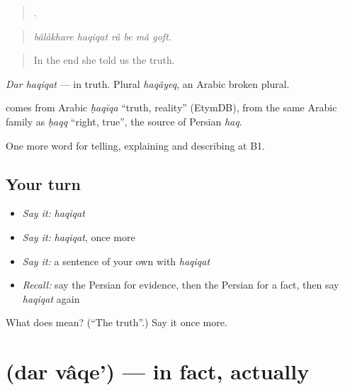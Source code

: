 \begin{quote}
     .
\end{quote}

\begin{quote}
\emph{bâlâkhare haqiqat râ be mâ goft.}
\end{quote}

\begin{quote}
In the end she told us the truth.
\end{quote}

\emph{Dar haqiqat} — in truth. Plural \emph{haqâyeq}, an Arabic broken plural.

\begin{cousinweb}
\textbf{} comes from Arabic \emph{ḥaqīqa} \textquotedblleft{}truth, reality\textquotedblright{} (EtymDB), from the same Arabic family as \emph{ḥaqq} \textquotedblleft{}right, true\textquotedblright{}, the source of Persian \emph{haq}.
\end{cousinweb}

\begin{grammarlens}[title={What you've built}]
One more word for telling, explaining and describing at B1.
\end{grammarlens}

\subsection*{Your turn}
\begin{itemize}
\raggedright
  \item \emph{Say it:} \emph{haqiqat}
  \item \emph{Say it:} \emph{haqiqat}, once more
  \item \emph{Say it:} a sentence of your own with \emph{haqiqat}
  \item \emph{Recall:} say the Persian for evidence, then the Persian for a fact, then say \emph{haqiqat} again
\end{itemize}

\begin{tcolorbox}[breakable,colback=teal!4,colframe=teal!35!black,title={Before you move on}]
What does  mean? (\textquotedblleft{}The truth\textquotedblright{}.) Say it once more.
\end{tcolorbox}
\section[\texorpdfstring{\fa{در} \fa{واقع} (dar vâqe')}{در واقع (dar vâqe')}]{  (dar vâqe') — in fact, actually}

